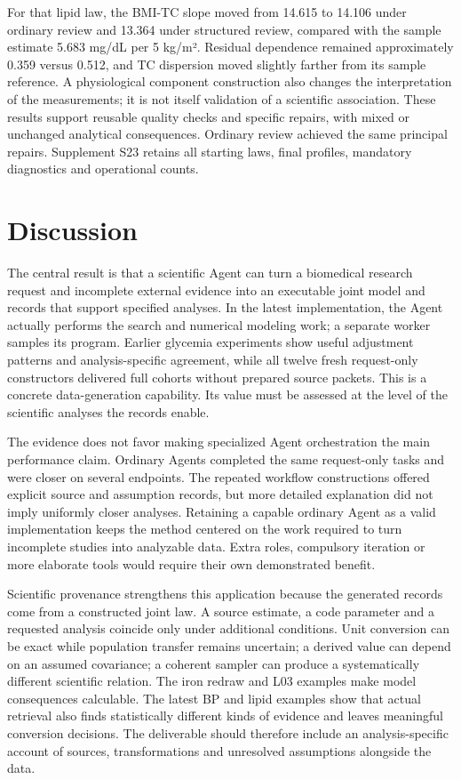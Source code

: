 \documentclass[11pt,letterpaper]{article}
\begin{document}
For that lipid law, the BMI-TC slope moved from 14.615 to 14.106 under ordinary review and 13.364 under structured review, compared with the sample estimate 5.683 mg/\allowbreak{}dL per 5 kg/\allowbreak{}m². Residual dependence remained approximately 0.359 versus 0.512, and TC dispersion moved slightly farther from its sample reference. A physiological component construction also changes the interpretation of the measurements; it is not itself validation of a scientific association. These results support reusable quality checks and specific repairs, with mixed or unchanged analytical consequences. Ordinary review achieved the same principal repairs. Supplement S23 retains all starting laws, final profiles, mandatory diagnostics and operational counts.


\section{Discussion}

The central result is that a scientific Agent can turn a biomedical research request and incomplete external evidence into an executable joint model and records that support specified analyses. In the latest implementation, the Agent actually performs the search and numerical modeling work; a separate worker samples its program. Earlier glycemia experiments show useful adjustment patterns and analysis-specific agreement, while all twelve fresh request-only constructors delivered full cohorts without prepared source packets. This is a concrete data-generation capability. Its value must be assessed at the level of the scientific analyses the records enable.


The evidence does not favor making specialized Agent orchestration the main performance claim. Ordinary Agents completed the same request-only tasks and were closer on several endpoints. The repeated workflow constructions offered explicit source and assumption records, but more detailed explanation did not imply uniformly closer analyses. Retaining a capable ordinary Agent as a valid implementation keeps the method centered on the work required to turn incomplete studies into analyzable data. Extra roles, compulsory iteration or more elaborate tools would require their own demonstrated benefit.


Scientific provenance strengthens this application because the generated records come from a constructed joint law. A source estimate, a code parameter and a requested analysis coincide only under additional conditions. Unit conversion can be exact while population transfer remains uncertain; a derived value can depend on an assumed covariance; a coherent sampler can produce a systematically different scientific relation. The iron redraw and L03 examples make model consequences calculable. The latest BP and lipid examples show that actual retrieval also finds statistically different kinds of evidence and leaves meaningful conversion decisions. The deliverable should therefore include an analysis-specific account of sources, transformations and unresolved assumptions alongside the data.
\end{document}

